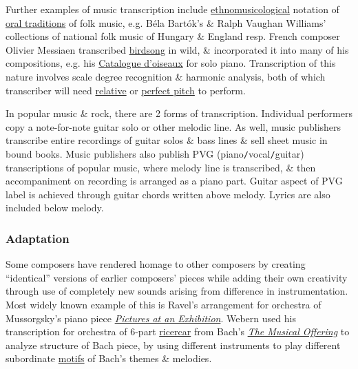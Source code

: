 \documentclass{article}
\begin{document}
Further examples of music transcription include \href{https://en.wikipedia.org/wiki/Ethnomusicology}{ethnomusicological} notation of \href{https://en.wikipedia.org/wiki/Oral_tradition}{oral traditions} of folk music, e.g. Béla Bartók's \& Ralph Vaughan Williams' collections of national folk music of Hungary \& England resp. French composer Olivier Messiaen transcribed \href{https://en.wikipedia.org/wiki/Bird_song}{birdsong} in wild, \& incorporated it into many of his compositions, e.g. his \href{https://en.wikipedia.org/wiki/Catalogue_d%27oiseaux}{Catalogue d'oiseaux} for solo piano. Transcription of this nature involves scale degree recognition \& harmonic analysis, both of which transcriber will need \href{https://en.wikipedia.org/wiki/Relative_pitch}{relative} or \href{https://en.wikipedia.org/wiki/Perfect_pitch}{perfect pitch} to perform. 

In popular music \& rock, there are 2 forms of transcription. Individual performers copy a note-for-note guitar solo or other melodic line. As well, music publishers transcribe entire recordings of guitar solos \& bass lines \& sell sheet music in bound books. Music publishers also publish PVG (piano{\tt/}vocal{\tt/}guitar) transcriptions of popular music, where melody line is transcribed, \& then accompaniment on recording is arranged as a piano part. Guitar aspect of PVG label is achieved through guitar chords written above melody. Lyrics are also included below melody.

\subsubsection{Adaptation}
Some composers have rendered homage to other composers by creating ``identical'' versions of earlier composers' pieces while adding their own creativity through use of completely new sounds arising from difference in instrumentation. Most widely known example of this is {\sc Ravel}'s arrangement for orchestra of {\sc Mussorgsky}'s piano piece \href{https://en.wikipedia.org/wiki/Pictures_at_an_Exhibition}{\it Pictures at an Exhibition}. {\sc Webern} used his transcription for orchestra of 6-part \href{https://en.wikipedia.org/wiki/Ricercar}{ricercar} from {\sc Bach}'s \href{https://en.wikipedia.org/wiki/The_Musical_Offering}{\it The Musical Offering} to analyze structure of Bach piece, by using different instruments to play different subordinate \href{https://en.wikipedia.org/wiki/Motif_(music)}{motifs} of Bach's themes \& melodies.
\end{document}

